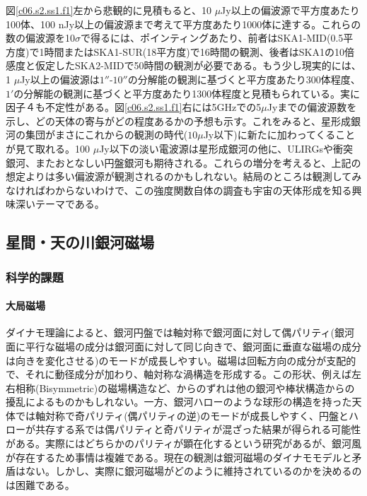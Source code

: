 図\ref{c06.s2.ss1.f1}左から悲観的に見積もると、10 $\mu$Jy以上の偏波源で平方度あたり100体、100 nJy以上の偏波源まで考えて平方度あたり1000体に達する。これらの数の偏波源を10$\sigma$で得るには、ポインティングあたり、前者はSKA1-MID(0.5平方度)で1時間またはSKA1-SUR(18平方度)で16時間の観測、後者はSKA1の10倍感度と仮定したSKA2-MIDで50時間の観測が必要である。もう少し現実的には、1 $\mu$Jy以上の偏波源は$1''$-$10''$の分解能の観測\citep{2014ApJ...785...45R, 2014MNRAS.440.3113H}に基づくと平方度あたり300体程度、$1'$の分解能の観測\cite{2014ApJ...787...99S}に基づくと平方度あたり1300体程度と見積もられている\citep{Cosmic_Magnetism_memo_2014}。実に因子４も不定性がある。図\ref{c06.s2.ss1.f1}右には5GHzでの5$\mu$Jyまでの偏波源数を示し、どの天体の寄与がどの程度あるかの予想も示す。これをみると、星形成銀河の集団がまさにこれからの観測の時代($10\mu$Jy以下)に新たに加わってくることが見て取れる。100 $\mu$Jy以下の淡い電波源は星形成銀河の他に、ULIRGsや衝突銀河、またおとなしい円盤銀河も期待される。これらの増分を考えると、上記の想定よりは多い偏波源が観測されるのかもしれない。結局のところは観測してみなければわからないわけで、この強度関数自体の調査も宇宙の天体形成を知る興味深いテーマである。


\subsection{星間・天の川銀河磁場}
\label{c06.s2.ss2}

\subsubsection{科学的課題}
\label{c06.s2.ss2.sss1}

\paragraph{大局磁場}

ダイナモ理論によると、銀河円盤では軸対称で銀河面に対して偶パリティ(銀河面に平行な磁場の成分は銀河面に対して同じ向きで、銀河面に垂直な磁場の成分は向きを変化させる)のモードが成長しやすい\citep{1988Natur.336..341R}。磁場は回転方向の成分が支配的で、それに動径成分が加わり、軸対称な渦構造を形成する。この形状、例えば左右相称(Bisymmetric)の磁場構造など、からのずれは他の銀河や棒状構造からの擾乱によるものかもしれない。一方、銀河ハローのような球形の構造を持った天体では軸対称で奇パリティ(偶パリティの逆)のモードが成長しやすく、円盤とハローが共存する系では偶パリティと奇パリティが混ざった結果が得られる可能性がある。実際にはどちらかのパリティが顕在化するという研究があるが\citep{2008A&A...487..197M}、銀河風が存在するため事情は複雑である。現在の観測は銀河磁場のダイナモモデルと矛盾はない。しかし、実際に銀河磁場がどのように維持されているのかを決めるのは困難である。


